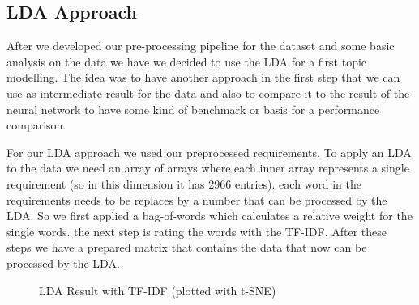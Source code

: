 \subsection{LDA Approach} %
\label{sub:own_lda}
After we developed our pre-processing pipeline for the dataset and some basic analysis on the data we have we decided to use the LDA for a first topic modelling. The idea was to have another approach in the first step that we can use as intermediate result for the data and also to compare it to the result of the neural network to have some kind of benchmark or basis for a performance comparison.


For our LDA approach we used our preprocessed requirements. To apply an LDA to the data we need an array of arrays where each inner array represents a single requirement (so in this dimension it has 2966 entries). each word in the requirements needs to be replaces by a number that can be processed by the LDA. So we first applied a bag-of-words which calculates a relative weight for the single words. the next step is rating the words with the TF-IDF. After these steps we have a prepared matrix that contains the data that now can be processed by the LDA.

\begin{figure}[bht]
    \caption{LDA Result with TF-IDF (plotted with t-SNE)} \label{fig:lda-tf-idf}
\end{figure}
\FloatBarrier

